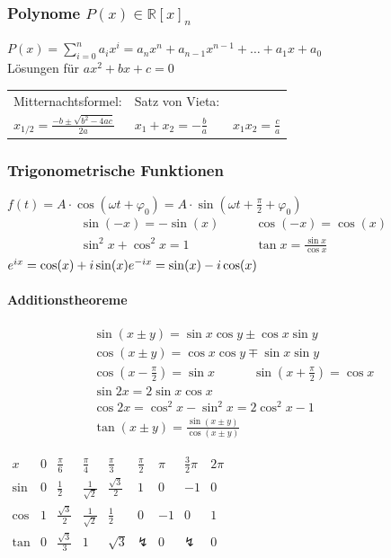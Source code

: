 \documentclass[6pt,a4paper]{scrartcl}
\newcommand{\enbrace}[1]{\ensuremath{\left(#1\right)}}
\newcommand{\R}{\ensuremath{\mathbb R}}
\begin{document}
\begin{multicols}{4}
\subsubsection{Polynome $P(x)\in\R[x]_n$}
$P(x)=\sum\limits_{i=0}^n a_ix^i=a_n x^n+a_{n-1} x^{n-1}+\dotsc+a_1x+a_0$ \\
Lösungen für $ax^2+bx+c=0$ \\
\begin{tabular}{l|l}
Mitternachtsformel:  &  Satz von Vieta:\\
$x_{1/2}=\frac{-b\pm\sqrt{b^2-4ac}}{2a}$  \quad & \quad   $x_1 + x_2 = - \frac{b}{a} \qquad x_1 x_2 = \frac{c}{a}$
\end{tabular}

\subsubsection{Trigonometrische Funktionen}
$f(t)=A\cdot \cos(\omega t + \varphi_0)=A\cdot \sin(\omega t + \frac{\pi}{2}+ \varphi_0)$
\begin{eqnarray*}
	\sin (-x) = -\sin (x)  \quad & \quad \cos (-x) = \cos (x) \\
	\sin^2 x + \cos^2 x = 1  \quad & \quad \tan x = \frac{\sin x}{\cos x}
\end{eqnarray*}
$e^{ix}=\cos(x)+i\sin(x)\\
e^{-ix}=\sin(x)-i\cos(x)$

\paragraph{Additionstheoreme} %
\label{par:additionstheoreme}
 \begin{eqnarray*}
    \sin \enbrace{x \pm y} = \sin x \cos y \pm \cos x \sin y \\
 	\cos \enbrace{x \pm y} = \cos x \cos y \mp \sin x \sin y \\
	\cos \enbrace{x - \frac{\pi}{2}} = \sin x \qquad \quad \sin \enbrace{x + \frac{\pi}{2}} = \cos x \\
	\sin 2x = 2 \sin x \cos x        \\
	\cos 2x = \cos^2 x - \sin^2 x = 2\cos^2 x - 1\\
	\tan(x\pm y)=\frac{\sin(x\pm y)}{\cos(x\pm y)}
 \end{eqnarray*}

$\begin{array}{c|c|c|c|c|c|c|c|c}
x & 0 & \frac{\pi}{6} & \frac{\pi}{4} & \frac{\pi}{3} & \frac{\pi}{2} & \pi & \frac{3}{2}\pi & 2 \pi \\ \hline
\sin & 0 & \frac{1}{2} & \frac{1}{\sqrt{2}} & \frac{\sqrt 3}{2} & 1 & 0 & -1 & 0 \\
\cos & 1 & \frac{\sqrt 3}{2} & \frac{1}{\sqrt 2} & \frac{1}{2} & 0 & -1 & 0 & 1 \\     
\tan & 0 & \frac{\sqrt{3}}{3}&	1				 &	\sqrt{3} & \lightning & 0 & \lightning & 0\\
\end{array}$


\end{multicols}
\end{document}
